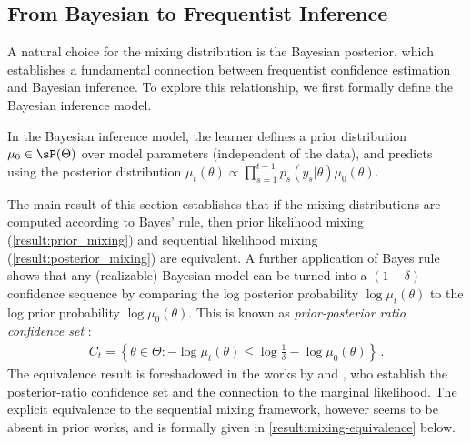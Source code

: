 
\subsection{From Bayesian to Frequentist Inference}\label{sec:bayes}

A natural choice for the mixing distribution is the Bayesian posterior, which establishes a fundamental connection between frequentist confidence estimation and Bayesian inference. To explore this relationship, we first formally define the Bayesian inference model.
\begin{assumption}\label{a:bayes}
    In the Bayesian inference model, the learner defines a prior distribution $\mu_0 \in \sP(\Theta)$ over model parameters (independent of the data), and predicts using the posterior distribution $\mu_t(\theta) \propto \prod_{s=1}^{t-1} p_s(y_s|\theta) \mu_0(\theta)$.
\end{assumption}
The main result of this section establishes that if the mixing distributions are computed according to Bayes' rule, then prior likelihood mixing (\cref{result:prior_mixing}) and sequential likelihood mixing (\cref{result:posterior_mixing}) are equivalent. A further application of Bayes rule shows that any (realizable) Bayesian model can be turned into a $(1-\delta)$-confidence sequence by comparing the log posterior probability $\log \mu_t(\theta)$ to the log prior probability $\log \mu_0(\theta)$. This is known as \emph{prior-posterior ratio confidence set} \citep{waudby2020confidence}: 
\begin{align*}
    C_t =  \left\{ \theta \in \Theta: - \log \mu_t(\theta) \leq  \log \frac{1}{\delta} - \log \mu_0(\theta) \right\} \,.
\end{align*}
The equivalence result is foreshadowed in the works by \citet{waudby2020confidence} and \citet{neiswanger2021uncertainty}, who establish the posterior-ratio confidence set and the connection to the marginal likelihood. The explicit equivalence to the sequential mixing framework, however seems to be absent in prior works, and is formally given in \cref{result:mixing-equivalence} below. 

